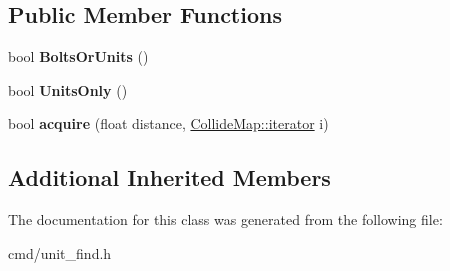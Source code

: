 \subsection*{Public Member Functions}
\begin{DoxyCompactItemize}
\item 
bool {\bfseries Bolts\+Or\+Units} ()\hypertarget{classNearestNavLocator_a4b71a4098b3f8f610606eed09379dbed}{}\label{classNearestNavLocator_a4b71a4098b3f8f610606eed09379dbed}

\item 
bool {\bfseries Units\+Only} ()\hypertarget{classNearestNavLocator_a8218c474839ce18b2cd059017d716686}{}\label{classNearestNavLocator_a8218c474839ce18b2cd059017d716686}

\item 
bool {\bfseries acquire} (float distance, \hyperlink{classCollidable}{Collide\+Map\+::iterator} i)\hypertarget{classNearestNavLocator_a15ba1e0856991d972773f88fce70df8b}{}\label{classNearestNavLocator_a15ba1e0856991d972773f88fce70df8b}

\end{DoxyCompactItemize}
\subsection*{Additional Inherited Members}


The documentation for this class was generated from the following file\+:\begin{DoxyCompactItemize}
\item 
cmd/unit\+\_\+find.\+h\end{DoxyCompactItemize}
